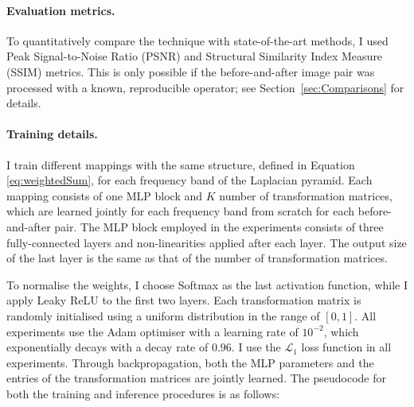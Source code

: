 \paragraph{Evaluation metrics.} To quantitatively compare the technique with state-of-the-art methods, I used Peak Signal-to-Noise Ratio (\gls{PSNR}) and Structural Similarity Index Measure (\gls{SSIM}) metrics. This is only possible if the before-and-after image pair was processed with a known, reproducible operator; see Section~\ref{sec:Comparisons} for details.

\paragraph{Training details.}\label{train_det} I train different mappings with the same structure, defined in Equation \ref{eq:weightedSum}, for each frequency band of the Laplacian pyramid. Each mapping consists of one \gls{MLP} block and $K$ number of transformation matrices, which are learned jointly for each frequency band from scratch for each before-and-after pair. The \gls{MLP} block employed in the experiments consists of three fully-connected layers and non-linearities applied after each layer. The output size of the last layer is the same as that of the number of transformation matrices.

To normalise the weights, I choose Softmax as the last activation function, while I apply Leaky \gls{ReLU} to the first two layers. Each transformation matrix is randomly initialised using a uniform distribution in the range of $[0, 1]$. All experiments use the Adam optimiser with a learning rate of $10^{-2}$, which exponentially decays with a decay rate of $0.96$. I use the $\mathcal{L}_{1}$ loss function in all experiments. Through backpropagation, both the \gls{MLP} parameters and the entries of the transformation matrices are jointly learned. The pseudocode for both the training and inference procedures is as follows:


